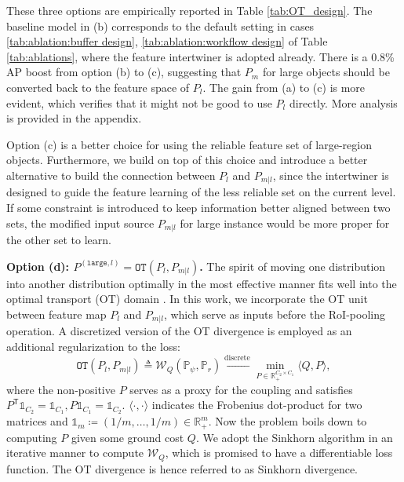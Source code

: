 \documentclass{article} \usepackage{iclr2019_conference,times}
\begin{document}
These three options are empirically reported 
in Table \ref{tab:OT_design}. 
The baseline model in (b) corresponds to the default setting in cases \ref{tab:ablation:buffer design}, \ref{tab:ablation:workflow design} of Table \ref{tab:ablations}, where the feature intertwiner is adopted already.
There is a 0.8\% AP boost from option (b) to (c), suggesting 
that $P_m$ for large objects should be converted back to the feature space of $P_l$. The gain from (a) to (c) is more evident, which verifies that it might not be good to use $P_l$ directly.
More analysis is provided in the appendix.






Option (c) is a better choice for using the reliable feature set of large-region objects. Furthermore, we build on top of this choice and introduce a better alternative to build the connection between $P_l$ and $P_{m|l}$, since the  intertwiner is designed to guide the feature learning of the less reliable set on the current level. 
If some constraint is introduced to keep information better aligned between two sets, the modified input source $P_{m|l}$ for large instance would be more proper for the other set to learn. 

\textbf{Option (d): {$P^{(\texttt{large}, l)}=\texttt{OT}(P_{l}, P_{m|l})$}.} The spirit of moving one distribution into another distribution optimally in the most effective manner fits well into the optimal transport (OT) domain \citep{peyre2018_ot_recent_book}. In this work, we incorporate the OT unit between feature map $P_l$ and $P_{m|l}$, which serve as inputs before the RoI-pooling operation.
A discretized version \citep{genevay2017_sinkhorn_loss,cuturi2013_regularized_OT} of the OT divergence is employed as an additional regularization to the loss:
\begin{equation}
\texttt{OT}(P_l, P_{m|l}) \triangleq \mathcal{W}_{Q}(  \mathds{P}_\psi, \mathds{P}_r  )   \xleftarrow[]{\text{discrete}} 
\min_{P \in \mathds{R}_{+}^{ C_2 \times C_1}}
\langle  Q, P\rangle, \label{ot_loss_discrete}
\end{equation}
where the non-positive  $P$ serves as a proxy for the coupling and satisfies $P^\mathsf{T} \mathds{1}_{C_2}  = \mathds{1}_{C_1}, P\mathds{1}_{C_1}  = \mathds{1}_{C_2}$. $ \langle  \cdot, \cdot\rangle$ indicates the Frobenius dot-product for two matrices and $\mathds{1}_m \coloneqq (1/m, \dots, 1/m) \in \mathds{R}_{+}^{m}$.
Now the problem boils down to computing $P$ given some ground cost $Q$.
We adopt the Sinkhorn algorithm \citep{sinkhorn1964_first} in an iterative manner to compute $\mathcal{W}_{Q}$, which is promised to have a differentiable loss function. The OT divergence is hence referred to as Sinkhorn divergence.
\end{document}
